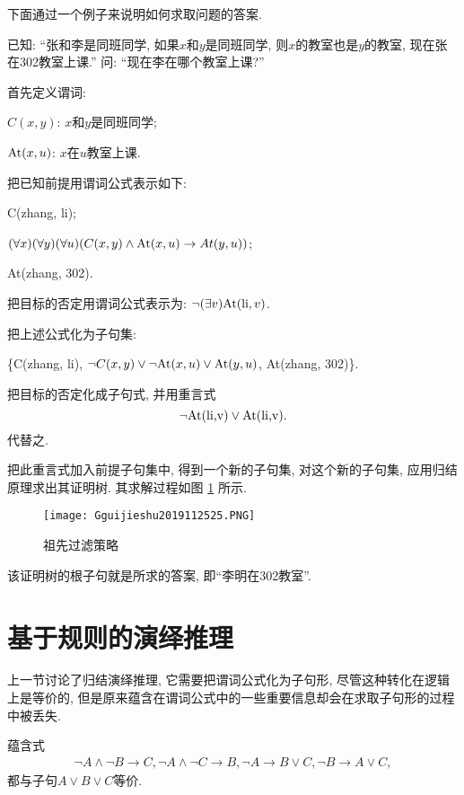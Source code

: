 下面通过一个例子来说明如何求取问题的答案.
\begin{example}
    已知: “张和李是同班同学, 如果$x$和$y$是同班同学, 则$x$的教室也是$y$的教室, 现在张在302教室上课.” 问: “现在李在哪个教室上课?”
\end{example}
\begin{result}
首先定义谓词:
\begin{center}
\begin{flushleft}
\quad $C(x, y)$:     $x$和$y$是同班同学;

\quad $\textup{At}(x, u)$:    $x$在$u$教室上课.
\end{flushleft}
\end{center}
把已知前提用谓词公式表示如下:
\begin{center}
\begin{flushleft}
\quad C(zhang, li);

\quad $(\forall x) (\forall y) (\forall u) (C(x, y)\wedge \textup{At}(x, u)\rightarrow At(y,u))$;

\quad \textup{At}(zhang, 302).
\end{flushleft}
\end{center}
把目标的否定用谓词公式表示为: $\neg (\exists  v)\textup{At}(\textup{li}, v)$.

把上述公式化为子句集:
\begin{center}
    \{\textup{C(zhang, li)}, $\neg C(x, y)\vee \neg \textup{At}(x, u)\vee \textup{At}(y, u)$, \textup{At}(zhang, 302)\}.
\end{center}

把目标的否定化成子句式, 并用重言式$$\neg \textup{At(li,v)} \vee \textup{At(li,v)}.$$
代替之.
\end{result}
把此重言式加入前提子句集中, 得到一个新的子句集, 对这个新的子句集, 应用归结原理求出其证明树. 其求解过程如图 \ref{AI32fig20200425} 所示.
\begin{figure}[H]
\centering
    \texttt{[image: Gguijieshu2019112525.PNG]}
    \caption{祖先过滤策略}
    \label{AI32fig20200425}
\end{figure}
该证明树的根子句就是所求的答案, 即“李明在302教室”.
\section{基于规则的演绎推理}
    上一节讨论了归结演绎推理, 它需要把谓词公式化为子句形, 尽管这种转化在逻辑上是等价的, 但是原来蕴含在谓词公式中的一些重要信息却会在求取子句形的过程中被丢失.
\begin{example}
蕴含式
\begin{align}
    \neg A\wedge \neg B\rightarrow C,  \neg A\wedge \neg C\rightarrow B,  \neg A\rightarrow B\vee C,\neg B\rightarrow A\vee C,
\end{align}
都与子句$A\vee B\vee C$等价.
\end{example}

